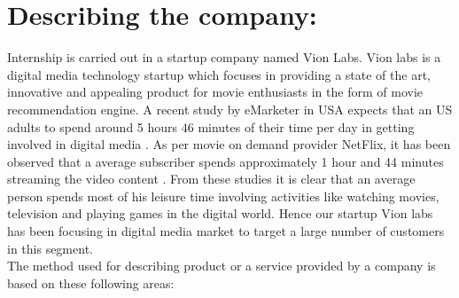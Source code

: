 \section{Describing the company:}
 Internship is carried out in a startup company named Vion Labs. Vion labs is a digital media technology startup which focuses in providing a state of the art, innovative and appealing product for movie enthusiasts in the form of movie recommendation engine. A recent study by eMarketer in USA expects that an US adults to spend around 5 hours 46 minutes of their time per day in getting involved in digital media \cite{Mobil1:online}. As per movie on demand provider NetFlix, it has been observed that a average subscriber spends approximately 1 hour and 44 minutes streaming the video content \cite{HowM2:online}. From these studies it is clear that an average person spends most of his leisure time involving activities like watching movies, television and playing games in the digital world. Hence our startup Vion labs has been focusing in digital media market to target a large number of customers in this segment. \\
 
 The method used for describing product or a service provided by a company is based on these following areas:
 
